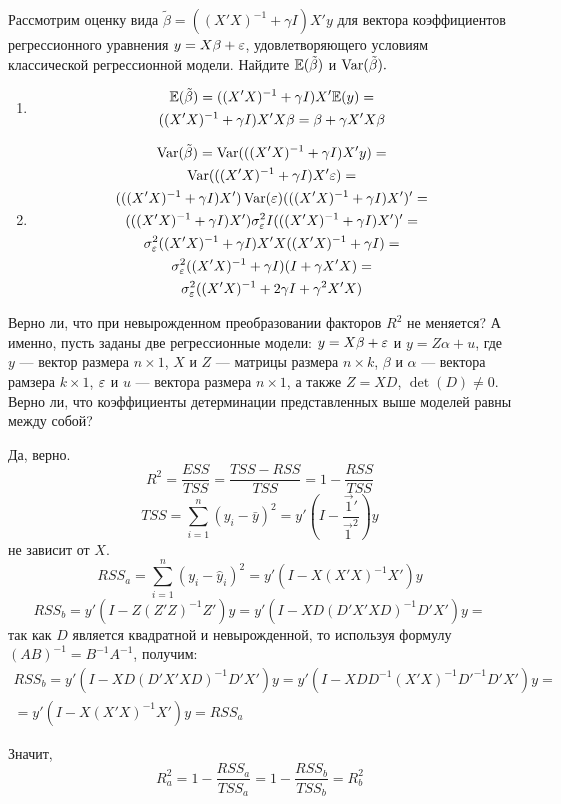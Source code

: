 \begin{problem}
Рассмотрим оценку вида $\tilde{\beta} = ((X'X)^{-1} + \gamma I)X'y$ для вектора коэффициентов регрессионного уравнения $y = X\beta + \varepsilon$, удовлетворяющего условиям классической регрессионной модели. Найдите $\mathbb{E}(\tilde{\beta})$ и $\operatorname{Var}(\tilde{\beta}).$ 
\end{problem}

\begin{solution}
\begin{enumerate}
\item 
\begin{multline}
\mathbb{E}(\tilde{\beta}) = ((X'X)^{-1} + \gamma I)X'\mathbb{E}(y) = \\
 ((X'X)^{-1} + \gamma I)X'X\beta = \beta + \gamma X'X\beta
\end{multline}
\item 
\begin{multline}
\operatorname{Var}(\tilde{\beta}) = \operatorname{Var}(((X'X)^{-1} + \gamma I)X'y) = \\
 \operatorname{Var}(((X'X)^{-1} + \gamma I)X'\varepsilon) = \\
 (((X'X)^{-1} + \gamma I)X')\operatorname{Var}(\varepsilon)(((X'X)^{-1} + \gamma I)X')'=  \\
  (((X'X)^{-1} + \gamma I)X')\sigma_{\varepsilon}^2 I(((X'X)^{-1} + \gamma I)X')'= \\
  \sigma_{\varepsilon}^2((X'X)^{-1} + \gamma I)X'X((X'X)^{-1} + \gamma I) = \\
  \sigma_{\varepsilon}^2((X'X)^{-1} + \gamma I)(I + \gamma X'X) =\\
   \sigma_{\varepsilon}^2((X'X)^{-1} + 2\gamma I + \gamma ^2 X'X)
\end{multline}
\end{enumerate}
\end{solution}



\begin{problem}
Верно ли, что при невырожденном преобразовании факторов $R^2$ не меняется? А именно, пусть заданы две регрессионные модели: $y = X\beta + \varepsilon$ и $y = Z\alpha + u$, где $y$ --- вектор размера $n \times 1$, $X$ и $Z$ --- матрицы размера $n \times k$, $\beta$ и $\alpha$ --- вектора рамзера $k \times 1$, $\varepsilon$ и $u$ --- вектора размера $n \times 1$, а также $Z=XD$, $\det(D) \not= 0.$ Верно ли, что коэффициенты детерминации представленных выше моделей равны между собой?
\end{problem}
\begin{solution}
Да, верно.
\[R^2=\frac{ESS}{TSS}=\frac{TSS-RSS}{TSS}=1-\frac{RSS}{TSS}\]
\[TSS=\sum_{i=1}^n(y_i-\bar y)^2=y'\left(I-\frac{\overrightarrow{1}'}{\overrightarrow{1}^2}\right)y\]
не зависит от $X$.
\[RSS_a=\sum_{i=1}^n(y_i-\hat y_i)^2=y'(I-X(X'X)^{-1}X')y\]
\[RSS_b=y'(I-Z(Z'Z)^{-1}Z')y=y'(I-XD(D'X'XD)^{-1}D'X')y=\]
так как $D$ является квадратной и невырожденной, то используя формулу $(AB)^{-1}=B^{-1}A^{-1}$, получим:
\begin{multline*}
RSS_b=y'(I-XD(D'X'XD)^{-1}D'X')y=y'(I-XDD^{-1}(X'X)^{-1}D'^{-1}D'X')y=\\=y'(I-X(X'X)^{-1}X')y=RSS_a
\end{multline*}

Значит,
\[R^2_a=1-\frac{RSS_a}{TSS_a}=1-\frac{RSS_b}{TSS_b}=R^2_b\]
\end{solution}


